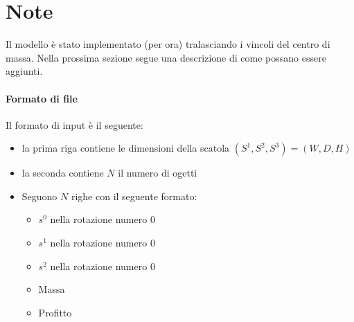 \documentclass{scrartcl}
\begin{document}
\section{Note}
Il modello è stato implementato (per ora) tralasciando i vincoli del centro di massa.
Nella prossima sezione segue una descrizione di come possano essere aggiunti.
\paragraph{Formato di file}
Il formato di input è il seguente:
\begin{itemize}
	\item la prima riga contiene le dimensioni della scatola $(S^1, S^2, S^3) = (W, D, H)$
	\item la seconda contiene $N$ il numero di ogetti
	\item Seguono $N$ righe con il seguente formato:
	\begin{itemize}
		\item $s^0$ nella rotazione numero $0$
		\item $s^1$ nella rotazione numero $0$
		\item $s^2$ nella rotazione numero $0$
		\item Massa
		\item Profitto
	\end{itemize}
\end{itemize}
\end{document}
